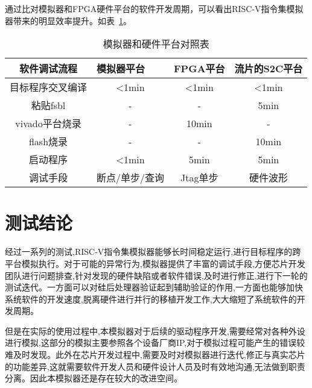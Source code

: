 通过比对模拟器和FPGA硬件平台的软件开发周期，可以看出RISC-V指令集模拟器带来的明显效率提升。如表~\ref{tab:cmp}。
\begin{table}[h]
  \centering
  \caption{模拟器和硬件平台对照表}
  \label{tab:cmp}
  \renewcommand\arraystretch{1.1}
  \begin{tabular}{cccc}
    \toprule
    \multicolumn{1}{c}{软件调试流程} & \multicolumn{1}{l}{模拟器平台} & \multicolumn{1}{l}{FPGA平台} &\multicolumn{1}{l}{流片的S2C平台}\\
    \midrule
目标程序交叉编译	& \multicolumn{1}{m{3cm}}{<1min} & \multicolumn{1}{m{3cm}}{<1min} & \multicolumn{1}{m{3cm}}{<1min}\\
\hline
粘贴fsbl	& \multicolumn{1}{m{3cm}}{-} & \multicolumn{1}{m{3cm}}{-} & \multicolumn{1}{m{3cm}}{5min}\\
\hline
vivado平台烧录	& \multicolumn{1}{m{3cm}}{-} & \multicolumn{1}{m{3cm}}{10min} & \multicolumn{1}{m{3cm}}{-}\\
\hline
flash烧录	& \multicolumn{1}{m{3cm}}{-} & \multicolumn{1}{m{3cm}}{-} & \multicolumn{1}{m{3cm}}{10min}\\
\hline
启动程序	& \multicolumn{1}{m{3cm}}{<1min} & \multicolumn{1}{m{3cm}}{5min} & \multicolumn{1}{m{3cm}}{5min}\\
\hline
调试手段	& \multicolumn{1}{m{3cm}}{断点/单步/查询} & \multicolumn{1}{m{3cm}}{Jtag单步} & \multicolumn{1}{m{3cm}}{硬件波形}\\
    \bottomrule
  \end{tabular}
\end{table}


\section{测试结论}
经过一系列的测试,RISC-V指令集模拟器能够长时间稳定运行,进行目标程序的跨平台模拟执行。对于可能的异常行为,模拟器提供了丰富的调试手段,方便芯片开发团队进行问题排查,针对发现的硬件缺陷或者软件错误,及时进行修正,进行下一轮的测试迭代。一方面可以对硅后处理器验证起到辅助验证的作用,一方面也能够加快系统软件的开发速度,脱离硬件进行并行的移植开发工作,大大缩短了系统软件的开发周期。


但是在实际的使用过程中,本模拟器对于后续的驱动程序开发,需要经常对各种外设进行模拟,这部分的模拟主要参照各个设备厂商IP,对于模拟过程可能产生的错误较难及时发现。此外在芯片开发过程中,需要及时对模拟器进行迭代,修正与真实芯片的功能差异,这就需要软件开发人员和硬件设计人员及时有效地沟通,无法做到职责分离。因此本模拟器还是存在较大的改进空间。